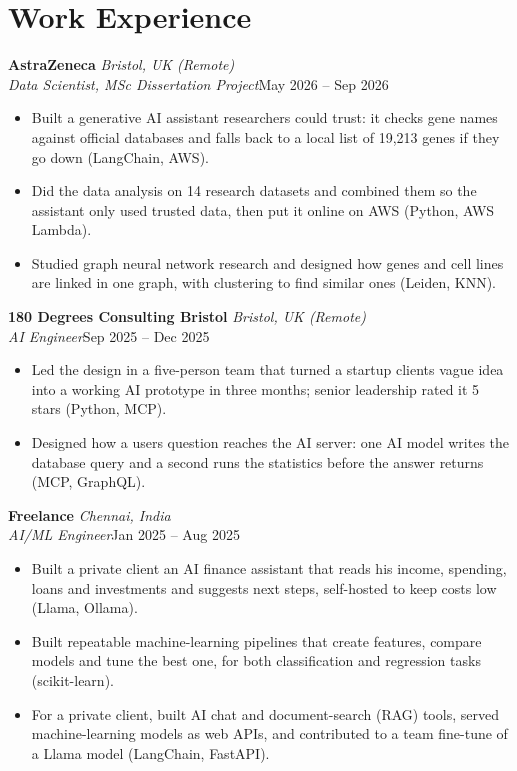 \documentclass[a4paper,11pt]{article}
\newcommand{\role}[4]{%
  \textbf{#1}{\color{muted}\,\textperiodcentered\,\textit{#2}}\\
  \textit{#4}\hfill{\color{muted}#3}\par}
\newcommand{\gap}{\vspace{5pt}}
\begin{document}
\section{Work Experience}
\role{AstraZeneca}{Bristol, UK (Remote)}{May 2026 – Sep 2026}{Data Scientist, MSc Dissertation Project}
\begin{itemize}
  \item Built a generative AI assistant researchers could trust: it checks gene names against official databases and falls back to a local list of 19,213 genes if they go down (LangChain, AWS).
  \item Did the data analysis on 14 research datasets and combined them so the assistant only used trusted data, then put it online on AWS (Python, AWS Lambda).
  \item Studied graph neural network research and designed how genes and cell lines are linked in one graph, with clustering to find similar ones (Leiden, KNN).
\end{itemize}
\gap
{}
\role{180 Degrees Consulting Bristol}{Bristol, UK (Remote)}{Sep 2025 – Dec 2025}{AI Engineer}
\begin{itemize}
  \item Led the design in a five-person team that turned a startup client\textquotesingle{}s vague idea into a working AI prototype in three months; senior leadership rated it 5 stars (Python, MCP).
  \item Designed how a user\textquotesingle{}s question reaches the AI server: one AI model writes the database query and a second runs the statistics before the answer returns (MCP, GraphQL).
\end{itemize}
\gap
{}
\role{Freelance}{Chennai, India}{Jan 2025 – Aug 2025}{AI/ML Engineer}
\begin{itemize}
  \item Built a private client an AI finance assistant that reads his income, spending, loans and investments and suggests next steps, self-hosted to keep costs low (Llama, Ollama).
  \item Built repeatable machine-learning pipelines that create features, compare models and tune the best one, for both classification and regression tasks (scikit-learn).
  \item For a private client, built AI chat and document-search (RAG) tools, served machine-learning models as web APIs, and contributed to a team fine-tune of a Llama model (LangChain, FastAPI).
\end{itemize}
\end{document}
